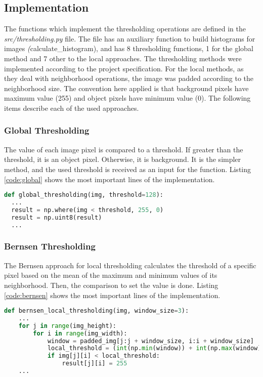 \documentclass[]{IEEEtran}
\begin{document}
\subsection{Implementation}
The functions which implement the thresholding operations are defined in the \textit{src/thresholding.py} file. The file has an auxiliary function to build histograms for images \textit(calculate\_histogram), and has 8 thresholding functions, 1 for the global method and 7 other to the local approaches. The thresholding methods were implemented according to the project specification. For the local methods, as they deal with neighborhood operations, the image was padded according to the neighborhood size. The convention here applied is that background pixels have maximum value (255) and object pixels have minimum value (0). The following items describe each of the used approaches.

\subsubsection{Global Thresholding}
The value of each image pixel is compared to a threshold. If greater than the threshold, it is an object pixel. Otherwise, it is background. It is the simpler method, and the used threshold is received as an input for the function. Listing \ref{code:global} shows the most important lines of the implementation.

\begin{lstlisting}[language=Python, caption={Global Thresholding Implementation}, label={code:global}]
def global_thresholding(img, threshold=128):
  ...
  result = np.where(img < threshold, 255, 0)
  result = np.uint8(result)
  ...
\end{lstlisting}

\subsubsection{Bernsen Thresholding}
The Bernsen approach for local thresholding calculates the threshold of a specific pixel based on the mean of the maximum and minimum values of its neighborhood. Then, the comparison to set the value is done. Listing \ref{code:bernsen} shows the most important lines of the implementation.

\begin{lstlisting}[language=Python, caption={Bernsen Local Thresholding Implementation}, label={code:bernsen}]
  def bernsen_local_thresholding(img, window_size=3):
    ...
    for j in range(img_height):
        for i in range(img_width):
            window = padded_img[j:j + window_size, i:i + window_size]
            local_threshold = (int(np.min(window)) + int(np.max(window)))//2
            if img[j][i] < local_threshold:
                result[j][i] = 255
    ...
\end{lstlisting}
\end{document}
